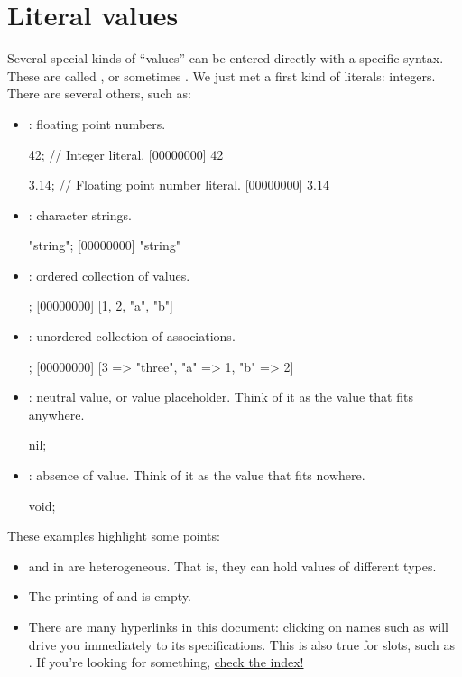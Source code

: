\section{Literal values}

Several special kinds of ``values'' can be entered directly with a specific
syntax.  These are called , or sometimes .  We just met a first kind of literals: integers.  There are
several others, such as:

\begin{itemize}
\item {}: floating point numbers.
\begin{urbiscript}
42; // Integer literal.
[00000000] 42

3.14; // Floating point number literal.
[00000000] 3.14
\end{urbiscript}

\item {}: character strings.
\begin{urbiscript}
"string";
[00000000] "string"
\end{urbiscript}

\item {}: ordered collection of values.
\begin{urbiscript}
[1, 2, "a", "b"];
[00000000] [1, 2, "a", "b"]
\end{urbiscript}

\item {}: unordered collection of
  associations.
\begin{urbiscript}
["a" => 1, "b" => 2, 3 => "three"];
[00000000] [3 => "three", "a" => 1, "b" => 2]
\end{urbiscript}

\item {}: neutral value, or value placeholder. Think of it as
  the value that fits anywhere.
\begin{urbiscript}
nil;
\end{urbiscript}

\item {}: absence of value. Think of it as the value that fits
  nowhere.
\begin{urbiscript}
void;
\end{urbiscript}
\end{itemize}

These examples highlight some points:
\begin{itemize}
\item {} and  in
  \us are heterogeneous. That is, they can hold values of different types.
\item The printing of  and  is empty.
\item There are many hyperlinks in this document: clicking on names such as
   will drive you immediately to its specifications.
  This is also true for slots, such as .  If you're
  looking for something, \hyperref[sec:index]{check the index!}
\end{itemize}


